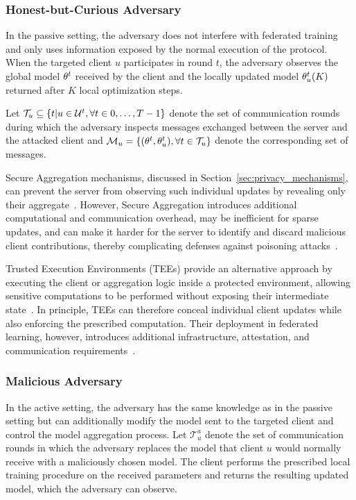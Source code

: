 \subsubsection{Honest-but-Curious Adversary}

In the passive setting, the adversary does not interfere with federated training and only uses information exposed by the normal execution of the protocol. When  the targeted client $u$ participates in round $t$, the adversary observes the global model $\theta^t$ received by the client and the locally updated model $\theta_u^t(K)$ returned after $K$ local optimization steps.

Let $\mathcal{T}_u \subseteq \{t|u\in\mathcal{U}^t, \forall t\in {0,\dots,T-1}\}$ denote the set of communication rounds during which the adversary inspects messages exchanged between the server and the attacked client and $\mathcal{M}_u = \{(\theta^t, \theta_u^t), \forall t\in \mathcal{T}_u\}$ denote the corresponding set of messages.

Secure Aggregation mechanisms, discussed in Section~\ref{sec:privacy_mechanisms}, can prevent the server from observing such individual updates by revealing only their aggregate~\cite{secure_aggregation_bonawitz,kadhe2020fastsecagg}.
However, Secure Aggregation introduces additional computational and communication overhead, may be inefficient for sparse updates, and can make it harder for the server to identify and discard malicious client contributions, thereby complicating defenses against poisoning attacks~\cite{quoc2020securetf,kairouz_open_problems,blanchard_byz,
yin2018byzantine,mhamdi2018hiddenvulnerabilitydistributedlearning,truthSerum}.

Trusted Execution Environments (TEEs) provide an alternative approach by executing the client or aggregation logic inside a protected environment, allowing sensitive computations to be performed without exposing their intermediate state~\cite{TEE,tee2}. In principle, TEEs can therefore conceal individual client updates while also enforcing the prescribed computation.
Their deployment in federated learning, however, introduces additional infrastructure, attestation, and communication requirements~\cite{kairouz_open_problems}.


\subsubsection{Malicious Adversary} 
In the active setting, the adversary has the same knowledge as in the passive setting but can additionally modify the model sent to the targeted client and control the model aggregation process. Let $\mathcal{T}^a_u$ denote the set of communication rounds in which the adversary replaces the model that client $u$ would normally receive with a maliciously chosen model. The client performs the prescribed local training procedure on the received parameters and returns the resulting updated model, which the adversary can observe.

